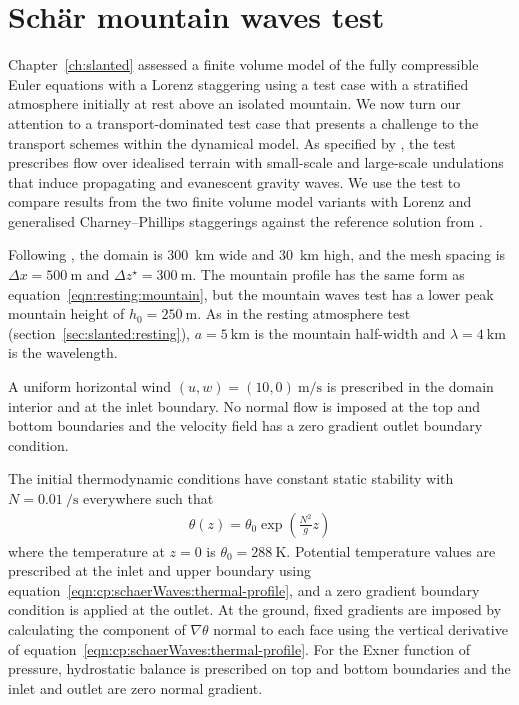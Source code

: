 \section{Sch\"{a}r mountain waves test}
\label{sec:cp:schaerWaves}

Chapter~\ref{ch:slanted} assessed a finite volume model of the fully compressible Euler equations with a Lorenz staggering using a test case with a stratified atmosphere initially at rest above an isolated mountain.
We now turn our attention to a transport-dominated test case that presents a challenge to the transport schemes within the dynamical model.
As specified by \citet{schaer2002}, the test prescribes flow over idealised terrain with small-scale and large-scale undulations that induce propagating and evanescent gravity waves.
We use the test to compare results from the two finite volume model variants with Lorenz and generalised Charney--Phillips staggerings against the reference solution from \citet{melvin2010}.

Following \citet{melvin2010}, the domain is \SI{300}{\kilo\meter} wide and \SI{30}{\kilo\meter} high, and the mesh spacing is $\Delta x = \SI{500}{\meter}$ and $\Delta z^\star = \SI{300}{\meter}$.
The mountain profile has the same form as equation~\eqref{eqn:resting:mountain}, but the mountain waves test has a lower peak mountain height of $h_0 = \SI{250}{\meter}$.  As in the resting atmosphere test (section~\ref{sec:slanted:resting}), $a = \SI{5}{\kilo\meter}$ is the mountain half-width and $\lambda = \SI{4}{\kilo\meter}$ is the wavelength.

A uniform horizontal wind $(u, w) = (10, 0)\:\si{\meter\per\second}$ is prescribed in the domain interior and at the inlet boundary.  No normal flow is imposed at the top and bottom boundaries and the velocity field has a zero gradient outlet boundary condition.

The initial thermodynamic conditions have constant static stability with $N = \SI{0.01}{\per\second}$ everywhere such that
\begin{align}
	\theta(z) = \theta_0 \exp \left( \frac{N^2}{g} z \right) \label{eqn:cp:schaerWaves:thermal-profile}
\end{align}
where the temperature at $z=0$ is $\theta_0 = \SI{288}{\kelvin}$.
Potential temperature values are prescribed at the inlet and upper boundary using equation~\eqref{eqn:cp:schaerWaves:thermal-profile}, and a zero gradient boundary condition is applied at the outlet.
At the ground, fixed gradients are imposed by calculating the component of $\nabla \theta$ normal to each face using the vertical derivative of equation~\eqref{eqn:cp:schaerWaves:thermal-profile}.
For the Exner function of pressure, hydrostatic balance is prescribed on top and bottom boundaries and the inlet and outlet are zero normal gradient.

